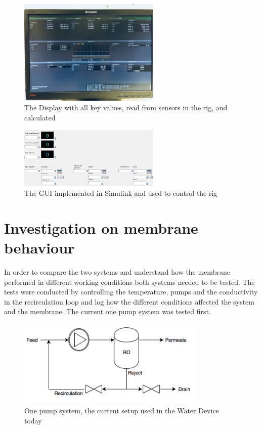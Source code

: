 \begin{figure}[H]
    \centering
    \includegraphics[width=0.6\textwidth]{Display}
    \caption{The Display with all key values, read from sensors in the rig, and calculated}
    \label{fig:display}
\end{figure}
\begin{figure}[H]
    \centering
    \includegraphics[width=0.6\textwidth]{GUI}
    \caption{The GUI implemented in Simulink and used to control the rig}
    \label{fig:gui}
\end{figure}


\newpage


\section{Investigation on membrane behaviour}

In order to compare the two systems and understand how the membrane performed in different working conditions both systems needed to be tested. The tests were conducted by controlling the temperature, pumps and the conductivity in the recirculation loop and log how the different conditions affected the system and the membrane. The current one pump system was tested first.
\begin{figure}[H]
  \centering
    \includegraphics[width=0.8\textwidth]{Sys1}
    \caption{One pump system, the current setup used in the Water Device today}
    \label{fig:System1}
\end{figure}

